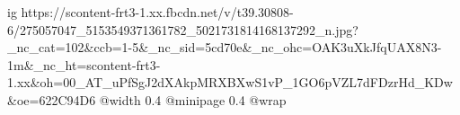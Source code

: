  
 
 
 
 

\ifcmt
  ig https://scontent-frt3-1.xx.fbcdn.net/v/t39.30808-6/275057047_5153549371361782_5021731814168137292_n.jpg?_nc_cat=102&ccb=1-5&_nc_sid=5cd70e&_nc_ohc=OAK3uXkJfqUAX8N3-1m&_nc_ht=scontent-frt3-1.xx&oh=00_AT_uPfSgJ2dXAkpMRXBXwS1vP_1GO6pVZL7dFDzrHd_KDw&oe=622C94D6
  @width 0.4
  @minipage 0.4
  @wrap \parpic[r]
\fi
